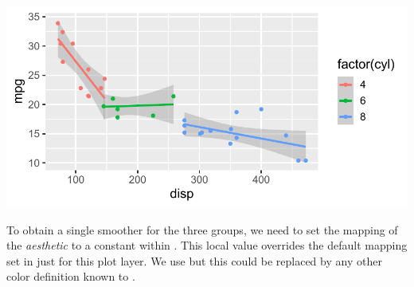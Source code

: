 \documentclass[krantz2]{krantz}\usepackage{knitr}
\begin{document}
\begin{knitrout}\footnotesize
{}\color{fgcolor}\begin{kframe}
\begin{alltt}
\hlstd{(}  \hlstd{(}     \hlstd{=}  \hlopt{+}
  \hlstd{(} \hlstd{=} \hlstd{,}   \hlopt{~}  \hlopt{+}
  \hlstd{()}
\end{alltt}
\end{kframe}

{\centering \includegraphics[width=.7\textwidth]{figure/pos-smooth-plot-04-1}

}



\end{knitrout}

To obtain a single smoother for the three groups, we need to set the mapping of the  \emph{aesthetic} to a constant within . This local value overrides the default  mapping set in  just for this plot layer. We use  but this could be replaced by any other color definition known to \Rlang.

\begin{knitrout}\footnotesize
{}\color{fgcolor}\begin{kframe}
\begin{alltt}
\hlstd{(}  \hlstd{(}     \hlstd{=}  \hlopt{+}
  \hlstd{(} \hlstd{=} \hlstd{,}   \hlopt{~}   \hlstd{=} \hlstd{)} \hlopt{+}
  \hlstd{()}
\end{alltt}
\end{kframe}
\end{knitrout}
\end{document}
